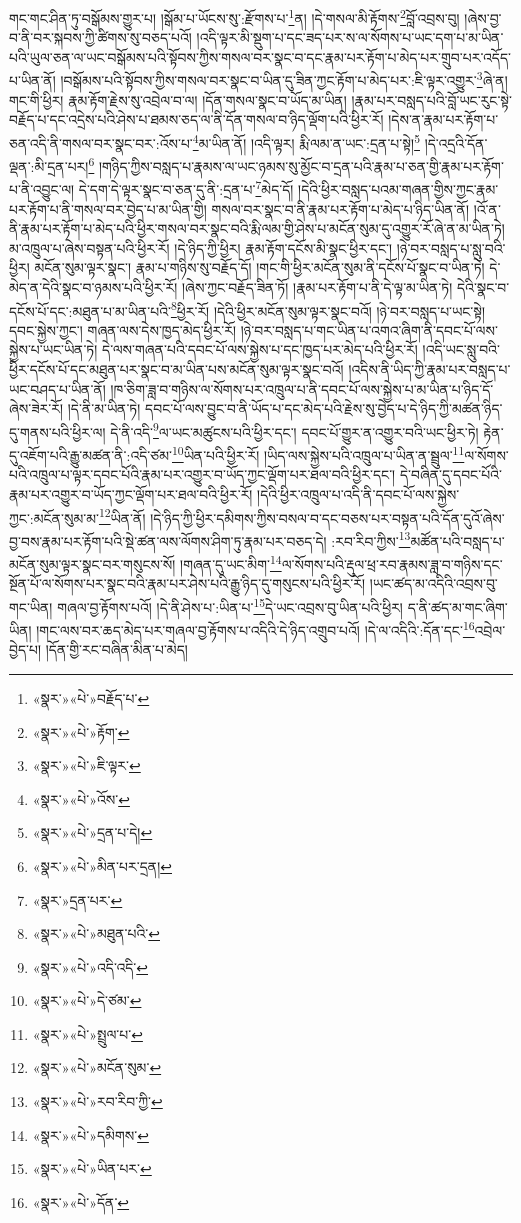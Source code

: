 གང་གང་ཤིན་ཏུ་བསྒོམས་གྱུར་པ། །སྒོམ་པ་ཡོངས་སུ་:རྫོགས་པ་\footnote{«སྣར་»«པེ་»བརྗོད་པ་}ན། །དེ་གསལ་མི་རྟོགས་\footnote{«སྣར་»«པེ་»རྟོག་}བློ་འབྲས་བུ། །ཞེས་བྱ་བ་ནི་བར་སྐབས་ཀྱི་ཚིགས་སུ་བཅད་པའོ། །འདི་ལྟར་མི་སྡུག་པ་དང་ཟད་པར་ས་ལ་སོགས་པ་ཡང་དག་པ་མ་ཡིན་པའི་ཡུལ་ཅན་ལ་ཡང་བསྒོམས་པའི་སྟོབས་ཀྱིས་གསལ་བར་སྣང་བ་དང་རྣམ་པར་རྟོག་པ་མེད་པར་གྲུབ་པར་འདོད་པ་ཡིན་ནོ། །བསྒོམས་པའི་སྟོབས་ཀྱིས་གསལ་བར་སྣང་བ་ཡིན་དུ་ཟིན་ཀྱང་རྟོག་པ་མེད་པར་:ཇི་ལྟར་འགྱུར་\footnote{«སྣར་»«པེ་»ཇི་ལྟར་}ཞེ་ན། གང་གི་ཕྱིར། རྣམ་རྟོག་རྗེས་སུ་འབྲེལ་བ་ལ། །དོན་གསལ་སྣང་བ་ཡོད་མ་ཡིན། །རྣམ་པར་བསླད་པའི་བློ་ཡང་རུང་སྟེ་བརྗོད་པ་དང་འདྲེས་པའི་ཤེས་པ་ཐམས་ཅད་ལ་ནི་དོན་གསལ་བ་ཉིད་ལྡོག་པའི་ཕྱིར་རོ། །དེས་ན་རྣམ་པར་རྟོག་པ་ཅན་འདི་ནི་གསལ་བར་སྣང་བར་:འོས་པ་\footnote{«སྣར་»«པེ་»འོས་}མ་ཡིན་ནོ། །འདི་ལྟར། རྨི་ལམ་ན་ཡང་:དྲན་པ་སྟེ།\footnote{«སྣར་»«པེ་»དྲན་པ་དེ།} །དེ་འདྲའི་དོན་ལྡན་:མི་དྲན་པར།\footnote{«སྣར་»«པེ་»མིན་པར་དྲན།} །གཉིད་ཀྱིས་བསླད་པ་རྣམས་ལ་ཡང་ཉམས་སུ་མྱོང་བ་དྲན་པའི་རྣམ་པ་ཅན་གྱི་རྣམ་པར་རྟོག་པ་ནི་འབྱུང་ལ། དེ་དག་དེ་ལྟར་སྣང་བ་ཅན་དུ་ནི་:དྲན་པ་\footnote{«སྣར་»དྲན་པར་}མེད་དོ། །དེའི་ཕྱིར་བསླད་པའམ་གཞན་གྱིས་ཀྱང་རྣམ་པར་རྟོག་པ་ནི་གསལ་བར་བྱེད་པ་མ་ཡིན་གྱི། གསལ་བར་སྣང་བ་ནི་རྣམ་པར་རྟོག་པ་མེད་པ་ཉིད་ཡིན་ནོ། །འོ་ན་ནི་རྣམ་པར་རྟོག་པ་མེད་པའི་ཕྱིར་གསལ་བར་སྣང་བའི་རྨི་ལམ་གྱི་ཤེས་པ་མངོན་སུམ་དུ་འགྱུར་རོ་ཞེ་ན་མ་ཡིན་ཏེ། མ་འཁྲུལ་པ་ཞེས་བསྟན་པའི་ཕྱིར་རོ། །དེ་ཉིད་ཀྱི་ཕྱིར། རྣམ་རྟོག་དངོས་མི་སྣང་ཕྱིར་དང་། །ཉེ་བར་བསླད་པ་སླུ་བའི་ཕྱིར། མངོན་སུམ་ལྟར་སྣང་། རྣམ་པ་གཉིས་སུ་བརྗོད་དོ། །གང་གི་ཕྱིར་མངོན་སུམ་ནི་དངོས་པོ་སྣང་བ་ཡིན་ཏེ། དེ་མེད་ན་དེའི་སྣང་བ་ཉམས་པའི་ཕྱིར་རོ། །ཞེས་ཀྱང་བརྗོད་ཟིན་ཏོ། །རྣམ་པར་རྟོག་པ་ནི་དེ་ལྟ་མ་ཡིན་ཏེ། དེའི་སྣང་བ་དངོས་པོ་དང་:མཐུན་པ་མ་ཡིན་པའི་\footnote{«སྣར་»«པེ་»མཐུན་པའི་}ཕྱིར་རོ། །དེའི་ཕྱིར་མངོན་སུམ་ལྟར་སྣང་བའོ། །ཉེ་བར་བསླད་པ་ཡང་སྟེ། དབང་སྐྱེས་ཀྱང་། གཞན་ལས་དེས་ཁྱད་མེད་ཕྱིར་རོ། །ཉེ་བར་བསླད་པ་གང་ཡིན་པ་འགའ་ཞིག་ནི་དབང་པོ་ལས་སྐྱེས་པ་ཡང་ཡིན་ཏེ། དེ་ལས་གཞན་པའི་དབང་པོ་ལས་སྐྱེས་པ་དང་ཁྱད་པར་མེད་པའི་ཕྱིར་རོ། །འདི་ཡང་སླུ་བའི་ཕྱིར་དངོས་པོ་དང་མཐུན་པར་སྣང་བ་མ་ཡིན་པས་མངོན་སུམ་ལྟར་སྣང་བའོ། །འདིས་ནི་ཡིད་ཀྱི་རྣམ་པར་བསླད་པ་ཡང་བཤད་པ་ཡིན་ནོ། །ཁ་ཅིག་ཟླ་བ་གཉིས་ལ་སོགས་པར་འཁྲུལ་པ་ནི་དབང་པོ་ལས་སྐྱེས་པ་མ་ཡིན་པ་ཉིད་དོ་ཞེས་ཟེར་རོ། །དེ་ནི་མ་ཡིན་ཏེ། དབང་པོ་ལས་བྱུང་བ་ནི་ཡོད་པ་དང་མེད་པའི་རྗེས་སུ་བྱེད་པ་དེ་ཉིད་ཀྱི་མཚན་ཉིད་དུ་གནས་པའི་ཕྱིར་ལ། དེ་ནི་འདི་\footnote{«སྣར་»«པེ་»འདི་འདི་}ལ་ཡང་མཚུངས་པའི་ཕྱིར་དང་། དབང་པོ་གྱུར་ན་འགྱུར་བའི་ཡང་ཕྱིར་ཏེ། རྟེན་དུ་འཇོག་པའི་རྒྱུ་མཚན་ནི་:འདི་ཙམ་\footnote{«སྣར་»«པེ་»དེ་ཙམ་}ཡིན་པའི་ཕྱིར་རོ། །ཡིད་ལས་སྐྱེས་པའི་འཁྲུལ་པ་ཡིན་ན་སྦྲུལ་\footnote{«སྣར་»«པེ་»སྤྲུལ་པ་}ལ་སོགས་པའི་འཁྲུལ་པ་ལྟར་དབང་པོའི་རྣམ་པར་འགྱུར་བ་ཡོད་ཀྱང་ལྡོག་པར་ཐལ་བའི་ཕྱིར་དང་། དེ་བཞིན་དུ་དབང་པོའི་རྣམ་པར་འགྱུར་བ་ཡོད་ཀྱང་ལྡོག་པར་ཐལ་བའི་ཕྱིར་རོ། །དེའི་ཕྱིར་འཁྲུལ་པ་འདི་ནི་དབང་པོ་ལས་སྐྱེས་ཀྱང་:མངོན་སུམ་མ་\footnote{«སྣར་»«པེ་»མངོན་སུམ་}ཡིན་ནོ། །དེ་ཉིད་ཀྱི་ཕྱིར་དམིགས་ཀྱིས་བསལ་བ་དང་བཅས་པར་བསྟན་པའི་དོན་དུའོ་ཞེས་བྱ་བས་རྣམ་པར་རྟོག་པའི་སྡེ་ཚན་ལས་ལོགས་ཤིག་ཏུ་རྣམ་པར་བཅད་དེ། :རབ་རིབ་ཀྱིས་\footnote{«སྣར་»«པེ་»རབ་རིབ་ཀྱི་}མཚོན་པའི་བསླད་པ་མངོན་སུམ་ལྟར་སྣང་བར་གསུངས་སོ། །གཞན་དུ་ཡང་མིག་\footnote{«སྣར་»«པེ་»དམིགས་}ལ་སོགས་པའི་རྡུལ་ཕྲ་རབ་རྣམས་ཟླ་བ་གཉིས་དང་སྔོན་པོ་ལ་སོགས་པར་སྣང་བའི་རྣམ་པར་ཤེས་པའི་རྒྱུ་ཉིད་དུ་གསུངས་པའི་ཕྱིར་རོ། །ཡང་ཚད་མ་འདིའི་འབྲས་བུ་གང་ཡིན། གཞལ་བྱ་རྟོགས་པའོ། །དེ་ནི་ཤེས་པ་:ཡིན་པ་\footnote{«སྣར་»«པེ་»ཡིན་པར་}དེ་ཡང་འབྲས་བུ་ཡིན་པའི་ཕྱིར། ད་ནི་ཚད་མ་གང་ཞིག་ཡིན། །གང་ལས་བར་ཆད་མེད་པར་གཞལ་བྱ་རྟོགས་པ་འདིའི་དེ་ཉིད་འགྲུབ་པའོ། །དེ་ལ་འདིའི་:དོན་དང་\footnote{«སྣར་»«པེ་»དོན་}འབྲེལ་བྱེད་པ། །དོན་གྱི་རང་བཞིན་མིན་པ་མེད། 